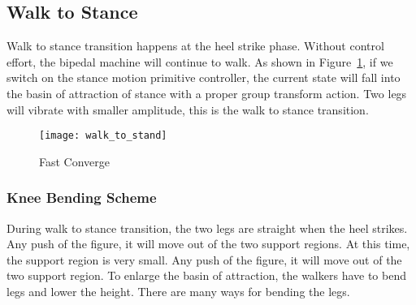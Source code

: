 \subsection{Walk to Stance}
Walk to stance transition happens at the heel strike phase.
Without control effort, the bipedal machine will continue to walk.
As shown in Figure~\ref{fig:walksstance}, if we switch on the stance motion primitive controller, the current state will fall into the basin of attraction of stance with a proper group transform action. 
Two legs will vibrate with smaller amplitude, this is the walk to stance transition.

\begin{figure}[!htbp]
  \begin{center}
    \texttt{[image: walk\_to\_stand]}
    \caption{Fast Converge}
    \label{fig:walksstance}
	\end{center}
\end{figure}







\subsubsection*{Knee Bending Scheme}
During walk to stance transition, the two legs are straight when the heel strikes.
Any push of the figure, it will move out of the two support regions. 
At this time, the support region is very small.
Any push of the figure, it will move out of the two support region.
To enlarge the basin of attraction, the walkers have to bend legs and lower the height.
There are many ways for bending the legs.


